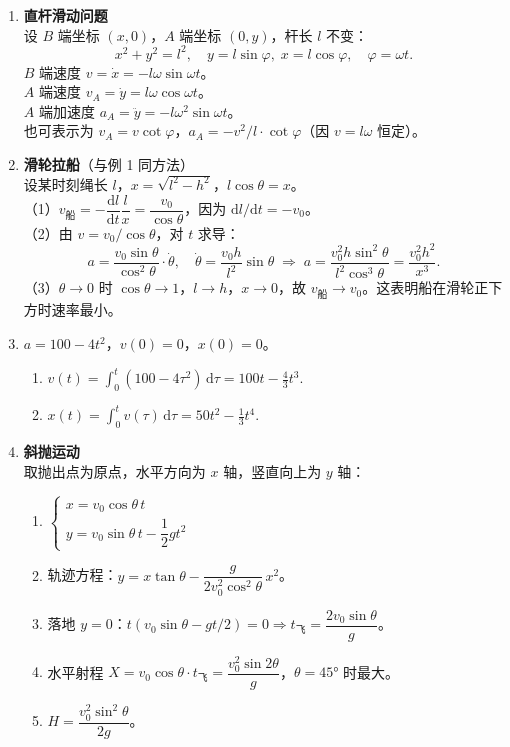 \documentclass[12pt]{article}
\begin{document}
\begin{enumerate}[label=\textbf{例\arabic*.}, leftmargin=*]
\item \textbf{直杆滑动问题}\\
设 $B$ 端坐标 $(x,0)$，$A$ 端坐标 $(0,y)$，杆长 $l$ 不变：
\[
  x^2 + y^2 = l^2,\quad y = l\sin\varphi,\; x = l\cos\varphi,\quad \varphi = \omega t.
\]
$B$ 端速度 $v = \dot{x} = -l\omega\sin\omega t$。\\
$A$ 端速度 $v_A = \dot{y} = l\omega\cos\omega t$。\\
$A$ 端加速度 $a_A = \ddot{y} = -l\omega^2\sin\omega t$。\\
也可表示为 $v_A = v\cot\varphi$，$a_A = -v^2/l \cdot \cot\varphi$（因 $v=l\omega$ 恒定）。

\item \textbf{滑轮拉船}（与例 1 同方法）\\
设某时刻绳长 $l$，$x = \sqrt{l^2 - h^2}$，$l\cos\theta = x$。\\
（1）$v_{\text{船}} = -\dfrac{\mathrm{d}l}{\mathrm{d}t}\dfrac{l}{x} = \dfrac{v_0}{\cos\theta}$，因为 $\mathrm{d}l/\mathrm{d}t = -v_0$。\\
（2）由 $v = v_0/\cos\theta$，对 $t$ 求导：
\[
  a = \frac{v_0\sin\theta}{\cos^2\theta}\cdot\dot{\theta},\quad \dot{\theta} = \frac{v_0 h}{l^2}\sin\theta \;\Rightarrow\; a = \frac{v_0^2 h \sin^2\theta}{l^2 \cos^3\theta} = \frac{v_0^2 h^2}{x^3}.
\]
（3）$\theta\to 0$ 时 $\cos\theta\to 1$，$l\to h$，$x\to 0$，故 $v_{\text{船}}\to v_0$。这表明船在滑轮正下方时速率最小。

\item $a = 100 - 4t^2$，$v(0) = 0$，$x(0) = 0$。
\begin{enumerate}[label=（\arabic*）]
  \item $v(t) = \displaystyle\int_0^t (100 - 4\tau^2)\,\mathrm{d}\tau = 100t - \frac{4}{3}t^3.$
  \item $x(t) = \displaystyle\int_0^t v(\tau)\,\mathrm{d}\tau = 50t^2 - \frac{1}{3}t^4.$
\end{enumerate}

\item \textbf{斜抛运动}\\
取抛出点为原点，水平方向为 $x$ 轴，竖直向上为 $y$ 轴：
\begin{enumerate}[label=（\arabic*）]
  \item $\begin{cases} x = v_0\cos\theta\,t \\ y = v_0\sin\theta\,t - \dfrac{1}{2}gt^2 \end{cases}$
  \item 轨迹方程：$y = x\tan\theta - \dfrac{g}{2v_0^2\cos^2\theta}\,x^2$。
  \item 落地 $y=0$：$t(v_0\sin\theta - gt/2)=0 \Rightarrow t_{\text{飞}} = \dfrac{2v_0\sin\theta}{g}$。
  \item 水平射程 $X = v_0\cos\theta\cdot t_{\text{飞}} = \dfrac{v_0^2 \sin 2\theta}{g}$，$\theta = 45°$ 时最大。
  \item $H = \dfrac{v_0^2\sin^2\theta}{2g}$。
\end{enumerate}


\end{enumerate}
\end{document}
